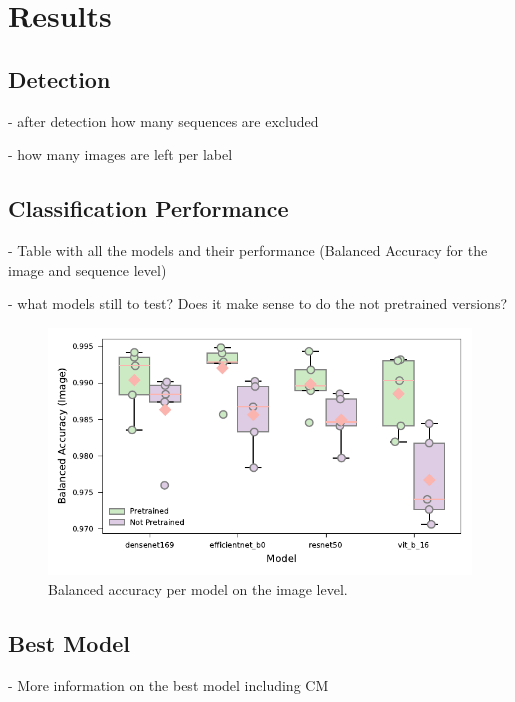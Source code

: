 

\section{Results}
\label{results}

    \subsection{Detection}

    - after detection how many sequences are excluded

    - how many images are left per label

    \subsection{Classification Performance}

    - Table with all the models and their performance (Balanced Accuracy for the image and sequence level)

    - what models still to test? Does it make sense to do the not pretrained versions?

    \begin{figure}[ht]
    \centering
    \includegraphics{figures/bal_acc_img.pdf}
    \caption{Balanced accuracy per model on the image level.}
    \label{fig:bal_acc_img}
    \end{figure}

    \subsection{Best Model}

    - More information on the best model including CM